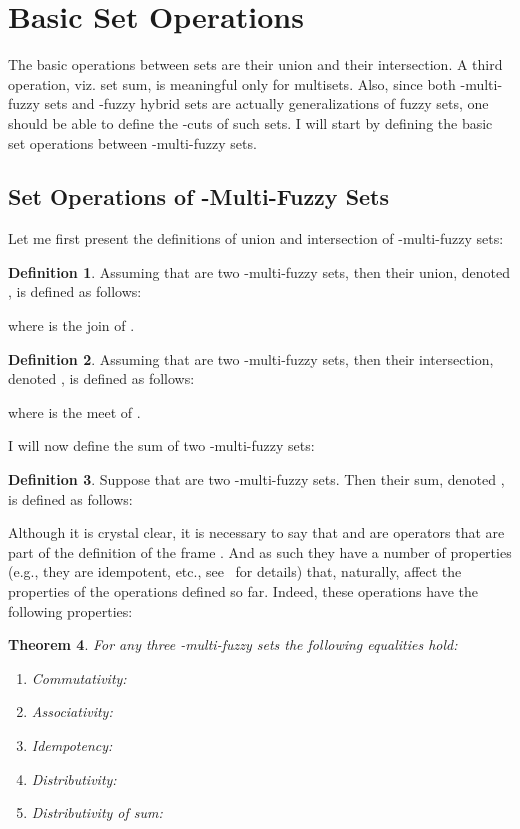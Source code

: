 \documentclass{amsart}
\newtheorem{theorem}{Theorem}[section]
\theoremstyle{definition}
\newtheorem{definition}[theorem]{Definition}
\begin{document}
\section{Basic Set Operations}
The basic operations between sets are their union and their intersection. A 
third operation, viz. set sum, is meaningful only for multisets. Also, since 
both -multi-fuzzy sets and -fuzzy hybrid sets are actually 
generalizations of fuzzy sets, one should be able to define the -cuts 
of such sets. I will start by defining the basic set operations between 
-multi-fuzzy sets.

\subsection{Set Operations of -Multi-Fuzzy Sets}
Let me first present the definitions of union and intersection of 
-multi-fuzzy sets:
\begin{definition} Assuming that  are two -multi-fuzzy  sets, then their union, denoted 
, is defined as follows:

where  is the join of .
\end{definition}
\begin{definition} Assuming that  are two -multi-fuzzy sets, then their intersection, denoted 
, is defined as follows:

where  is the meet of .
\end{definition}
I will now define the sum of two -multi-fuzzy sets:
\begin{definition}
Suppose that  
are two -multi-fuzzy sets. Then their sum, denoted 
, is defined as follows:

\end{definition}
Although it is crystal clear, it is necessary to say that  and  are 
operators that are part of the definition of the frame . And as such they have a number
of properties (e.g., they are idempotent, etc., see~\cite[p.~15]{vickers90} for details) 
that, naturally, affect the properties of the operations defined so far. Indeed, these 
operations have the following properties:
\begin{theorem}
For any three -multi-fuzzy sets  the following equalities hold:
\begin{enumerate}
\item Commutativity:


\item Associativity:


\item Idempotency:


\item Distributivity:


\item Distributivity of sum:

\end{enumerate}
\end{theorem}
\end{document}

